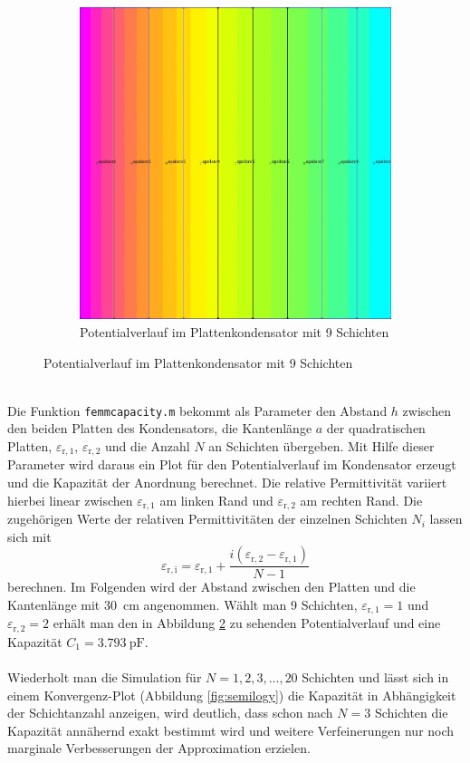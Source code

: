 \begin{figure}[h!]
\begin{subfigure}[h]{0.51\textwidth}
		\includegraphics[width=\textwidth]{data/KondensatorN9}
		\caption{Potentialverlauf im Plattenkondensator mit 9 Schichten}
		\label{fig:N9}
	\end{subfigure}
	\caption{Potentialverlauf im Plattenkondensator mit 9 Schichten}
\end{figure} \\
Die Funktion \texttt{femmcapacity.m} bekommt als Parameter den Abstand $h$ zwischen den beiden Platten des Kondensators, die Kantenlänge $a$ der quadratischen Platten, $\varepsilon_{\mathrm{r,1}}$, $\varepsilon_{\mathrm{r,2}}$ und die Anzahl $N$ an Schichten übergeben. Mit Hilfe dieser Parameter wird daraus ein Plot für den Potentialverlauf im Kondensator erzeugt und die Kapazität der Anordnung berechnet. Die relative Permittivität variiert hierbei linear zwischen $\varepsilon_{\mathrm{r,1}} $ am linken Rand und $\varepsilon_{\mathrm{r,2}}$ am rechten Rand. Die zugehörigen Werte der relativen Permittivitäten der einzelnen Schichten $N_i$ lassen sich mit $$ \varepsilon_{\mathrm{r,i}} = \varepsilon_{\mathrm{r,1}} + \frac{i (\varepsilon_{\mathrm{r,2}}-\varepsilon_{\mathrm{r,1}})}{N-1}$$ berechnen. Im Folgenden wird der Abstand zwischen den Platten und die Kantenlänge mit \SI{30}{\centi\meter} angenommen. Wählt man 9 Schichten, $\varepsilon_{\mathrm{r,1}} = 1$ und $\varepsilon_{\mathrm{r,2}} = 2$  erhält man den in Abbildung \ref{fig:N9} zu sehenden Potentialverlauf und eine Kapazität $ C_1 = \SI{3,793}{\pico\farad}$.\\ \\
Wiederholt man die Simulation für $N = 1,2,3,...,20$ Schichten und lässt sich in einem Konvergenz-Plot (Abbildung \ref{fig:semilogy}) die Kapazität in Abhängigkeit der Schichtanzahl anzeigen, wird deutlich, dass schon nach $N=3$ Schichten die Kapazität annähernd exakt bestimmt wird und weitere Verfeinerungen nur noch marginale Verbesserungen der Approximation erzielen. \\ \\

